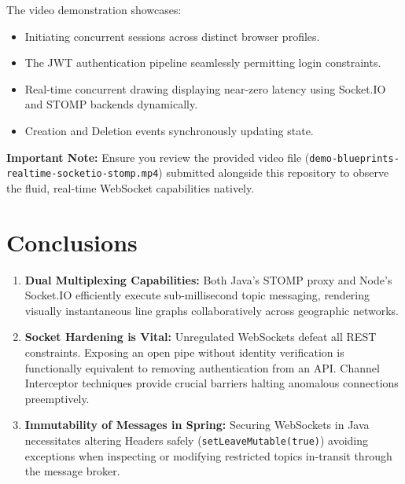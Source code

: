 \documentclass[10pt,a4paper,twocolumn]{article}
\begin{document}
\begin{resultbox}[title={Demo Recording}]
The video demonstration showcases:
\begin{itemize}
    \item Initiating concurrent sessions across distinct browser profiles.
    \item The JWT authentication pipeline seamlessly permitting login constraints.
    \item Real-time concurrent drawing displaying near-zero latency using Socket.IO and STOMP backends dynamically.
    \item Creation and Deletion events synchronously updating state.
\end{itemize}
\textbf{Important Note:} Ensure you review the provided video file (\texttt{demo-blueprints-realtime-socketio-stomp.mp4}) submitted alongside this repository to observe the fluid, real-time WebSocket capabilities natively.
\end{resultbox}


\section{Conclusions}

\begin{resultbox}[title={Key Findings}]
\begin{enumerate}
  \item \textbf{Dual Multiplexing Capabilities:} Both Java's STOMP proxy and 
        Node's Socket.IO efficiently execute sub-millisecond topic messaging, 
        rendering visually instantaneous line graphs collaboratively across geographic networks.
  \item \textbf{Socket Hardening is Vital:} Unregulated WebSockets defeat all 
        REST constraints. Exposing an open pipe without identity verification is functionally equivalent to removing authentication from an API. Channel Interceptor techniques provide crucial 
        barriers halting anomalous connections preemptively.
  \item \textbf{Immutability of Messages in Spring:} Securing WebSockets in Java 
        necessitates altering Headers safely (\texttt{setLeaveMutable(true)}) avoiding 
        exceptions when inspecting or modifying restricted topics in-transit through the message broker.
\end{enumerate}
\end{resultbox}
\end{document}
